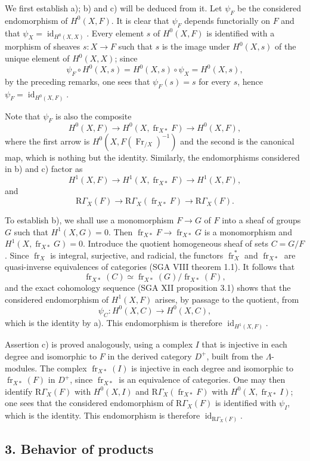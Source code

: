 \documentclass[11pt]{article}
\providecommand{\RGamma}{\mathrm R\Gamma}
\providecommand{\id}{\operatorname{id}}
\providecommand{\id}{\operatorname{id}}
\providecommand{\id}{\operatorname{id}}
\providecommand{\RGamma}{\mathrm R\Gamma}
\providecommand{\id}{\operatorname{id}}
\providecommand{\id}{\operatorname{id}}
\providecommand{\fr}{\operatorname{fr}}
\providecommand{\Fr}{\operatorname{Fr}}
\providecommand{\Fr}{\operatorname{Fr}}
\providecommand{\fr}{\operatorname{fr}}
\providecommand{\id}{\operatorname{id}}
\providecommand{\RGamma}{\mathrm R\Gamma}
\begin{document}
We first establish a); b) and c) will be deduced from it. Let $\psi_F$ be the considered endomorphism of $H^0(X,F)$. It is clear that $\psi_F$ depends functorially on $F$ and that $\psi_X=\id_{H^0(X,X)}$. Every element $s$ of $H^0(X,F)$ is identified with a morphism of sheaves $s:X\to F$ such that $s$ is the image under $H^0(X,s)$ of the unique element of $H^0(X,X)$; since
\[
\psi_F\circ H^0(X,s)=H^0(X,s)\circ\psi_X=H^0(X,s),
\]
by the preceding remarks, one sees that $\psi_F(s)=s$ for every $s$, hence $\psi_F=\id_{H^0(X,F)}$.

Note that $\psi_F$ is also the composite
\[
H^0(X,F)\longrightarrow H^0(X,\fr_{X*}F)
\longrightarrow H^0(X,F),
\]
where the first arrow is $H^0(X,F(\Fr_{/X})^{-1})$ and the second is the canonical map, which is nothing but the identity. Similarly, the endomorphisms considered in b) and c) factor as
\[
H^1(X,F)\longrightarrow H^1(X,\fr_{X*}F)
\longrightarrow H^1(X,F),
\]
and
\[
\RGamma_X(F)\longrightarrow \RGamma_X(\fr_{X*}F)
\longrightarrow \RGamma_X(F).
\]

To establish b), we shall use a monomorphism $F\to G$ of $F$ into a sheaf of groups $G$ such that $H^1(X,G)=0$. Then $\fr_{X*}F\to\fr_{X*}G$ is a monomorphism and $H^1(X,\fr_{X*}G)=0$. Introduce the quotient homogeneous sheaf of sets $C=G/F$. Since $\fr_X$ is integral, surjective, and radicial, the functors $\fr_X^*$ and $\fr_{X*}$ are quasi-inverse equivalences of categories (SGA VIII theorem 1.1). It follows that
\[
\fr_{X*}(C)\simeq\fr_{X*}(G)/\fr_{X*}(F),
\]
and the exact cohomology sequence (SGA XII proposition 3.1) shows that the considered endomorphism of $H^1(X,F)$ arises, by passage to the quotient, from
\[
\psi_C:H^0(X,C)\longrightarrow H^0(X,C),
\]
which is the identity by a). This endomorphism is therefore $\id_{H^1(X,F)}$.

Assertion c) is proved analogously, using a complex $I$ that is injective in each degree and isomorphic to $F$ in the derived category $D^+$, built from the $\Lambda$-modules. The complex $\fr_{X*}(I)$ is injective in each degree and isomorphic to $\fr_{X*}(F)$ in $D^+$, since $\fr_{X*}$ is an equivalence of categories. One may then identify $\RGamma_X(F)$ with $H^0(X,I)$ and $\RGamma_X(\fr_{X*}F)$ with $H^0(X,\fr_{X*}I)$; one sees that the considered endomorphism of $\RGamma_X(F)$ is identified with $\psi_I$, which is the identity. This endomorphism is therefore $\id_{\RGamma_X(F)}$.

\subsection*{3. Behavior of products}\label{sga5:XV:subsection:3}
\end{document}
